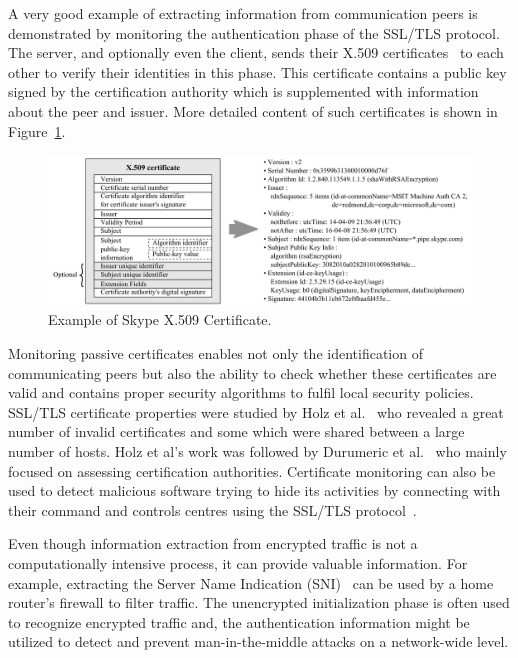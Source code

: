 A very good example of extracting information from communication peers is demonstrated by monitoring the authentication phase of the SSL/TLS protocol. The server, and optionally even the client, sends their X.509 certificates~\cite{rfc5280} to each other to verify their identities in this phase. This certificate contains a public key signed by the certification authority which is supplemented with information about the peer and issuer. More detailed content of such certificates is shown in Figure~\ref{fig:certificates-contents}.

\begin{figure}[!ht]
	\begin{center}
		\includegraphics[width=0.9\linewidth]{figures/paper-encrypted/certificate}
		\caption{Example of Skype X.509 Certificate.}
		\label{fig:certificates-contents}
	\end{center}
\end{figure}

Monitoring passive certificates enables not only the identification of communicating peers but also the ability to check whether these certificates are valid and contains proper security algorithms to fulfil local security policies. SSL/TLS certificate properties were studied by Holz et al.~\cite{Holz-2011-SSL} who revealed a great number of invalid certificates and some which were shared between a large number of hosts. Holz et al's work was followed by Durumeric et al.~\cite{Durumeric-2013-Analysis} who mainly focused on assessing certification authorities. Certificate monitoring can also be used to detect malicious software trying to hide its activities by connecting with their command and controls centres using the SSL/TLS protocol~\cite{ssl-certificates-blacklist}.

Even though information extraction from encrypted traffic is not a computationally intensive process, it can provide valuable information. For example, extracting the Server Name Indication (SNI)~\cite{rfc4366} can be used by a home router's firewall to filter traffic. The unencrypted initialization phase is often used to recognize encrypted traffic and, the authentication information might be utilized to detect and prevent man-in-the-middle attacks on a network-wide level.

